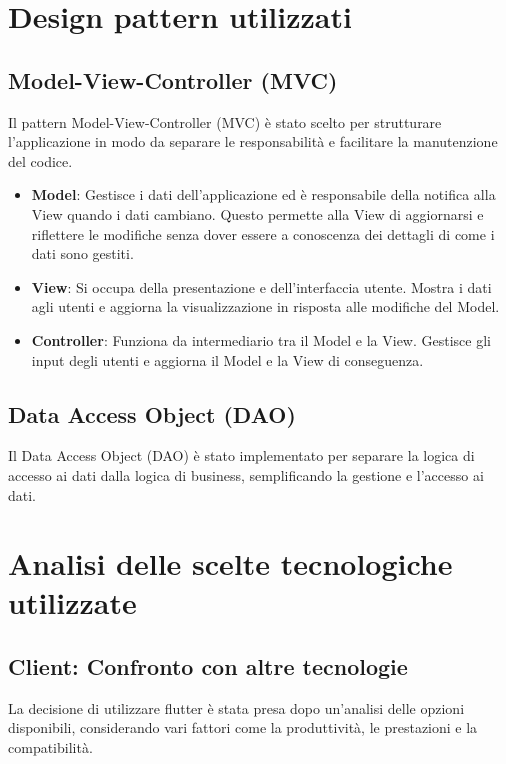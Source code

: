 \section{Design pattern utilizzati}

\subsection{Model-View-Controller (MVC)}
Il pattern Model-View-Controller (MVC) è stato scelto per strutturare l'applicazione in modo da separare le responsabilità e facilitare la manutenzione del codice.

\begin{itemize}
	\item \textbf{Model}: Gestisce i dati dell'applicazione ed è responsabile della notifica alla View quando i dati cambiano. Questo permette alla View di aggiornarsi e riflettere le modifiche senza dover essere a conoscenza dei dettagli di come i dati sono gestiti.

	\item \textbf{View}: Si occupa della presentazione e dell'interfaccia utente. Mostra i dati agli utenti e aggiorna la visualizzazione in risposta alle modifiche del Model.

    \item \textbf{Controller}: Funziona da intermediario tra il Model e la View. Gestisce gli input degli utenti e aggiorna il Model e la View di conseguenza.
\end{itemize}

\subsection{Data Access Object (DAO)}
Il Data Access Object (DAO) è stato implementato per separare la logica di accesso ai dati dalla logica di business, semplificando la gestione e l'accesso ai dati.

\newpage
\section{Analisi delle scelte tecnologiche utilizzate}
\subsection{Client: Confronto con altre tecnologie}
La decisione di utilizzare flutter è stata presa dopo un'analisi delle opzioni disponibili, considerando vari fattori come la produttività, le prestazioni e la compatibilità.

